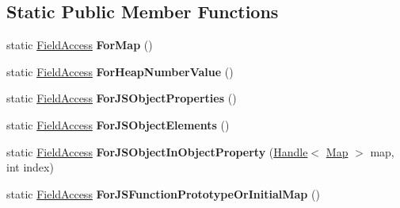\subsection*{Static Public Member Functions}
\begin{DoxyCompactItemize}
\item 
static \hyperlink{structv8_1_1internal_1_1compiler_1_1_field_access}{Field\+Access} {\bfseries For\+Map} ()\hypertarget{classv8_1_1internal_1_1compiler_1_1_access_builder_ac2bb52ee54e5b0ae7bbbbd4ea32a2647}{}\label{classv8_1_1internal_1_1compiler_1_1_access_builder_ac2bb52ee54e5b0ae7bbbbd4ea32a2647}

\item 
static \hyperlink{structv8_1_1internal_1_1compiler_1_1_field_access}{Field\+Access} {\bfseries For\+Heap\+Number\+Value} ()\hypertarget{classv8_1_1internal_1_1compiler_1_1_access_builder_a1fa84722d5a19479546399b5803d9325}{}\label{classv8_1_1internal_1_1compiler_1_1_access_builder_a1fa84722d5a19479546399b5803d9325}

\item 
static \hyperlink{structv8_1_1internal_1_1compiler_1_1_field_access}{Field\+Access} {\bfseries For\+J\+S\+Object\+Properties} ()\hypertarget{classv8_1_1internal_1_1compiler_1_1_access_builder_a0d6105104006aa27356444f0bfdbbf52}{}\label{classv8_1_1internal_1_1compiler_1_1_access_builder_a0d6105104006aa27356444f0bfdbbf52}

\item 
static \hyperlink{structv8_1_1internal_1_1compiler_1_1_field_access}{Field\+Access} {\bfseries For\+J\+S\+Object\+Elements} ()\hypertarget{classv8_1_1internal_1_1compiler_1_1_access_builder_afce72fe75259f693baee5435e7f9073d}{}\label{classv8_1_1internal_1_1compiler_1_1_access_builder_afce72fe75259f693baee5435e7f9073d}

\item 
static \hyperlink{structv8_1_1internal_1_1compiler_1_1_field_access}{Field\+Access} {\bfseries For\+J\+S\+Object\+In\+Object\+Property} (\hyperlink{classv8_1_1internal_1_1_handle}{Handle}$<$ \hyperlink{classv8_1_1internal_1_1_map}{Map} $>$ map, int index)\hypertarget{classv8_1_1internal_1_1compiler_1_1_access_builder_a1966ddbbd8f28ce33b30f700eb345f42}{}\label{classv8_1_1internal_1_1compiler_1_1_access_builder_a1966ddbbd8f28ce33b30f700eb345f42}

\item 
static \hyperlink{structv8_1_1internal_1_1compiler_1_1_field_access}{Field\+Access} {\bfseries For\+J\+S\+Function\+Prototype\+Or\+Initial\+Map} ()\hypertarget{classv8_1_1internal_1_1compiler_1_1_access_builder_ae67ee224508da0a19ca07ad72ac025ec}{}\label{classv8_1_1internal_1_1compiler_1_1_access_builder_ae67ee224508da0a19ca07ad72ac025ec}


\end{DoxyCompactItemize}
